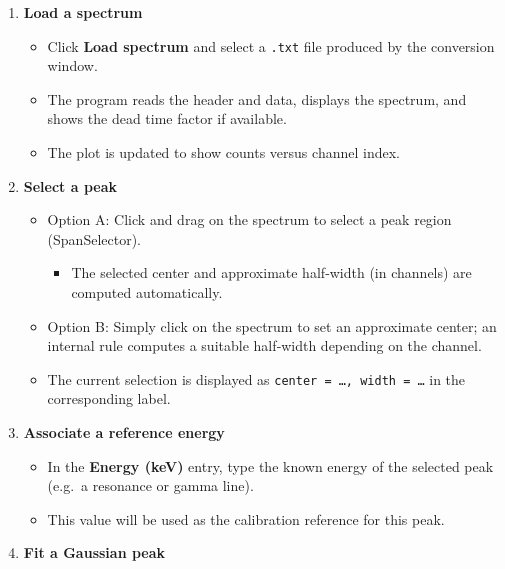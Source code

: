 \begin{enumerate}
\def\labelenumi{\arabic{enumi}.}
\tightlist
\item
  \textbf{Load a spectrum}

  \begin{itemize}
  \tightlist
  \item
    Click \textbf{Load spectrum} and select a \texttt{.txt} file
    produced by the conversion window.\\
  \item
    The program reads the header and data, displays the spectrum, and
    shows the dead time factor if available.\\
  \item
    The plot is updated to show counts versus channel index.
  \end{itemize}
\item
  \textbf{Select a peak}

  \begin{itemize}
  \tightlist
  \item
    Option A: Click and drag on the spectrum to select a peak region
    (SpanSelector).

    \begin{itemize}
    \tightlist
    \item
      The selected center and approximate half‑width (in channels) are
      computed automatically.\\
    \end{itemize}
  \item
    Option B: Simply click on the spectrum to set an approximate center;
    an internal rule computes a suitable half‑width depending on the
    channel.\\
  \item
    The current selection is displayed as
    \texttt{center\ =\ \ldots{},\ width\ =\ \ldots{}} in the
    corresponding label.
  \end{itemize}
\item
  \textbf{Associate a reference energy}

  \begin{itemize}
  \tightlist
  \item
    In the \textbf{Energy (keV)} entry, type the known energy of the
    selected peak (e.g.~a resonance or gamma line).\\
  \item
    This value will be used as the calibration reference for this peak.
  \end{itemize}
\item
  \textbf{Fit a Gaussian peak}


\end{enumerate}
